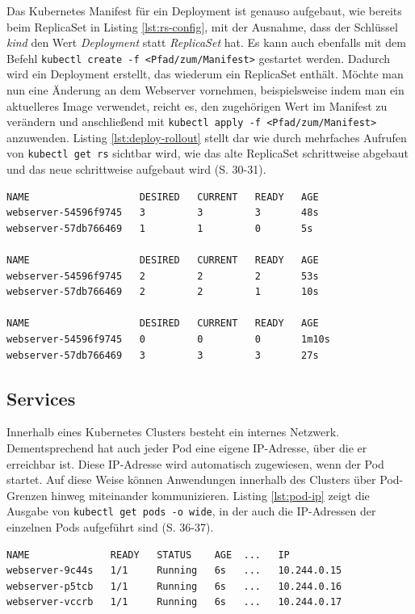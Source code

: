 \documentclass[11pt,a4paper]{article}
\begin{document}
Das Kubernetes Manifest für ein Deployment ist genauso aufgebaut, wie bereits beim ReplicaSet in
Listing \ref{lst:rs-config}, mit der Ausnahme, dass der Schlüssel \emph{kind} den Wert
\emph{Deployment} statt \emph{ReplicaSet} hat. Es kann auch ebenfalls mit dem Befehl
\lstinline|kubectl create -f <Pfad/zum/Manifest>| gestartet werden.
Dadurch wird ein Deployment erstellt, das wiederum ein ReplicaSet enthält.
Möchte man nun eine Änderung an dem Webserver vornehmen, beispielsweise indem
man ein aktuelleres Image verwendet, reicht es, den zugehörigen Wert im Manifest
zu verändern und anschließend mit \lstinline|kubectl apply -f <Pfad/zum/Manifest>| anzuwenden.
Listing \ref{lst:deploy-rollout} stellt dar wie durch mehrfaches Aufrufen
von \lstinline|kubectl get rs| sichtbar wird, wie das alte
ReplicaSet schrittweise abgebaut und das neue schrittweise aufgebaut wird \cite{Schmeling_Dargatz_2022} (S. 30-31).

\begin{lstlisting}[caption={Ein Deployment, das schrittweise ein Update ausführt \cite{Schmeling_Dargatz_2022} (S. 31).}, label={lst:deploy-rollout}]
NAME                   DESIRED   CURRENT   READY   AGE
webserver-54596f9745   3         3         3       48s
webserver-57db766469   1         1         0       5s

NAME                   DESIRED   CURRENT   READY   AGE
webserver-54596f9745   2         2         2       53s
webserver-57db766469   2         2         1       10s

NAME                   DESIRED   CURRENT   READY   AGE
webserver-54596f9745   0         0         0       1m10s
webserver-57db766469   3         3         3       27s

\end{lstlisting}

\subsection{Services}
Innerhalb eines Kubernetes Clusters besteht ein internes Netzwerk. Dementsprechend hat auch jeder Pod
eine eigene IP-Adresse, über die er erreichbar ist. Diese IP-Adresse wird automatisch zugewiesen, wenn der Pod startet.
Auf diese Weise können Anwendungen innerhalb des Clusters über Pod-Grenzen hinweg miteinander kommunizieren.
Listing \ref{lst:pod-ip} zeigt die Ausgabe von \lstinline|kubectl get pods -o wide|, in der auch die IP-Adressen
der einzelnen Pods aufgeführt sind \cite{Schmeling_Dargatz_2022} (S. 36-37).
\begin{lstlisting}[caption={\lstinline|kubectl get pods -o wide| veranschautlicht, dass jeder Pod seine eigene IP-Adresse erhält. Die Ausgabe wurde zur besseren Lesbarkeit gekürzt \cite{Schmeling_Dargatz_2022} (S. 35).}, label={lst:pod-ip}]
NAME              READY   STATUS    AGE  ...   IP           
webserver-9c44s   1/1     Running   6s   ...   10.244.0.15
webserver-p5tcb   1/1     Running   6s   ...   10.244.0.16
webserver-vccrb   1/1     Running   6s   ...   10.244.0.17
\end{lstlisting}
\end{document}
